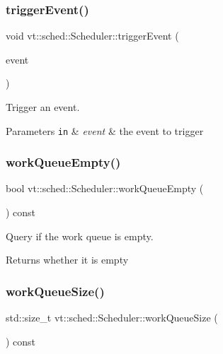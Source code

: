 \subsubsection{\texorpdfstring{trigger\+Event()}{triggerEvent()}}
{\footnotesize\ttfamily void vt\+::sched\+::\+Scheduler\+::trigger\+Event (\begin{DoxyParamCaption}\item[{\hyperlink{namespacevt_1_1sched_a54756ec39b60951d6765fcfa692d1616}{Scheduler\+Event\+Type} const \&}]{event }\end{DoxyParamCaption})}



Trigger an event. 


\begin{DoxyParams}[1]{Parameters}
\mbox{\tt in}  & {\em event} & the event to trigger \\
\hline
\end{DoxyParams}
\mbox{\label{structvt_1_1sched_1_1_scheduler_a49bfd7d4a6d187c6c995b84885a1ed19}} 
\subsubsection{\texorpdfstring{work\+Queue\+Empty()}{workQueueEmpty()}}
{\footnotesize\ttfamily bool vt\+::sched\+::\+Scheduler\+::work\+Queue\+Empty (\begin{DoxyParamCaption}{ }\end{DoxyParamCaption}) const\hspace{0.3cm}{\ttfamily [inline]}}



Query if the work queue is empty. 

\begin{DoxyReturn}{Returns}
whether it is empty 
\end{DoxyReturn}
\mbox{\label{structvt_1_1sched_1_1_scheduler_a6ee315ffd90f37a277bb2b5622af1f4f}} 
\subsubsection{\texorpdfstring{work\+Queue\+Size()}{workQueueSize()}}
{\footnotesize\ttfamily std\+::size\+\_\+t vt\+::sched\+::\+Scheduler\+::work\+Queue\+Size (\begin{DoxyParamCaption}{ }\end{DoxyParamCaption}) const\hspace{0.3cm}{\ttfamily [inline]}}



